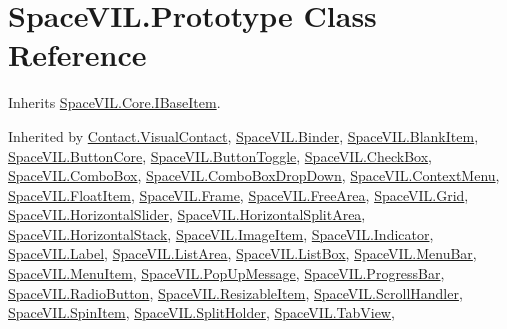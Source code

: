 \hypertarget{class_space_v_i_l_1_1_prototype}{}\section{Space\+V\+I\+L.\+Prototype Class Reference}
\label{class_space_v_i_l_1_1_prototype}


Inherits \mbox{\hyperlink{interface_space_v_i_l_1_1_core_1_1_i_base_item}{Space\+V\+I\+L.\+Core.\+I\+Base\+Item}}.



Inherited by \mbox{\hyperlink{class_contact_1_1_visual_contact}{Contact.\+Visual\+Contact}}, \mbox{\hyperlink{class_space_v_i_l_1_1_binder}{Space\+V\+I\+L.\+Binder}}, \mbox{\hyperlink{class_space_v_i_l_1_1_blank_item}{Space\+V\+I\+L.\+Blank\+Item}}, \mbox{\hyperlink{class_space_v_i_l_1_1_button_core}{Space\+V\+I\+L.\+Button\+Core}}, \mbox{\hyperlink{class_space_v_i_l_1_1_button_toggle}{Space\+V\+I\+L.\+Button\+Toggle}}, \mbox{\hyperlink{class_space_v_i_l_1_1_check_box}{Space\+V\+I\+L.\+Check\+Box}}, \mbox{\hyperlink{class_space_v_i_l_1_1_combo_box}{Space\+V\+I\+L.\+Combo\+Box}}, \mbox{\hyperlink{class_space_v_i_l_1_1_combo_box_drop_down}{Space\+V\+I\+L.\+Combo\+Box\+Drop\+Down}}, \mbox{\hyperlink{class_space_v_i_l_1_1_context_menu}{Space\+V\+I\+L.\+Context\+Menu}}, \mbox{\hyperlink{class_space_v_i_l_1_1_float_item}{Space\+V\+I\+L.\+Float\+Item}}, \mbox{\hyperlink{class_space_v_i_l_1_1_frame}{Space\+V\+I\+L.\+Frame}}, \mbox{\hyperlink{class_space_v_i_l_1_1_free_area}{Space\+V\+I\+L.\+Free\+Area}}, \mbox{\hyperlink{class_space_v_i_l_1_1_grid}{Space\+V\+I\+L.\+Grid}}, \mbox{\hyperlink{class_space_v_i_l_1_1_horizontal_slider}{Space\+V\+I\+L.\+Horizontal\+Slider}}, \mbox{\hyperlink{class_space_v_i_l_1_1_horizontal_split_area}{Space\+V\+I\+L.\+Horizontal\+Split\+Area}}, \mbox{\hyperlink{class_space_v_i_l_1_1_horizontal_stack}{Space\+V\+I\+L.\+Horizontal\+Stack}}, \mbox{\hyperlink{class_space_v_i_l_1_1_image_item}{Space\+V\+I\+L.\+Image\+Item}}, \mbox{\hyperlink{class_space_v_i_l_1_1_indicator}{Space\+V\+I\+L.\+Indicator}}, \mbox{\hyperlink{class_space_v_i_l_1_1_label}{Space\+V\+I\+L.\+Label}}, \mbox{\hyperlink{class_space_v_i_l_1_1_list_area}{Space\+V\+I\+L.\+List\+Area}}, \mbox{\hyperlink{class_space_v_i_l_1_1_list_box}{Space\+V\+I\+L.\+List\+Box}}, \mbox{\hyperlink{class_space_v_i_l_1_1_menu_bar}{Space\+V\+I\+L.\+Menu\+Bar}}, \mbox{\hyperlink{class_space_v_i_l_1_1_menu_item}{Space\+V\+I\+L.\+Menu\+Item}}, \mbox{\hyperlink{class_space_v_i_l_1_1_pop_up_message}{Space\+V\+I\+L.\+Pop\+Up\+Message}}, \mbox{\hyperlink{class_space_v_i_l_1_1_progress_bar}{Space\+V\+I\+L.\+Progress\+Bar}}, \mbox{\hyperlink{class_space_v_i_l_1_1_radio_button}{Space\+V\+I\+L.\+Radio\+Button}}, \mbox{\hyperlink{class_space_v_i_l_1_1_resizable_item}{Space\+V\+I\+L.\+Resizable\+Item}}, \mbox{\hyperlink{class_space_v_i_l_1_1_scroll_handler}{Space\+V\+I\+L.\+Scroll\+Handler}}, \mbox{\hyperlink{class_space_v_i_l_1_1_spin_item}{Space\+V\+I\+L.\+Spin\+Item}}, \mbox{\hyperlink{class_space_v_i_l_1_1_split_holder}{Space\+V\+I\+L.\+Split\+Holder}}, \mbox{\hyperlink{class_space_v_i_l_1_1_tab_view}{Space\+V\+I\+L.\+Tab\+View}}, 